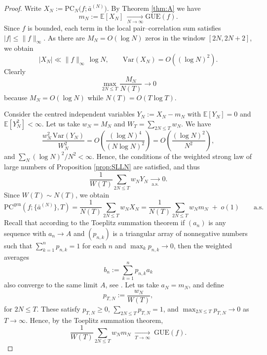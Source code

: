 \documentclass[12pt,reqno]{amsart}
\theoremstyle{plain}
\theoremstyle{definition}
\theoremstyle{remark}
\begin{document}
\begin{proof}
Write $X_N:=\mathrm{PC}_N\!\bigl(f;\bar a^{(N)}\bigr)$. 
By Theorem \ref{thm:A} we have
\begin{equation}\label{eq:mean-to-GUE}
m_N := \mathbb{E}[X_N]\ \xrightarrow[N\to\infty]{} \mathrm{GUE}(f).
\end{equation}
Since $f$ is bounded, each term in the local pair–correlation sum satisfies 
$|f|\le \|f\|_\infty$. 
As there are $M_N = O(\log N)$ zeros in the window $[2N,2N+2]$, we obtain
\begin{equation}
|X_N| \ll \|f\|_\infty\, \log N,
\qquad
\mathrm{Var}(X_N)=O\!\left((\log N)^2\right).
\end{equation}
Clearly  
\begin{equation}
\max_{2N\le T} \frac{M_N}{N(T)} \to 0
\end{equation} 
because $M_N = O(\log N)$ while $N(T)=O(T\log T)$. 

Consider the centred independent variables 
$Y_N := X_N - m_N$ with $\mathbb{E}[Y_N]=0$ and $\mathbb{E}[Y_N^2]<\infty$.
Let us take $w_N=M_N$ and $W_T=\sum_{2N\le T} w_N$. We have
\begin{equation}
\frac{w_N^2\,\mathrm{Var}(Y_N)}{W_N^2}
= O\!\left(\frac{(\log N)^4}{(N\log N)^2}\right)
= O\!\left(\frac{(\log N)^2}{N^2}\right),
\end{equation}
and $\sum_N (\log N)^2/N^2<\infty$. 
Hence, the conditions of the weighted strong law of large numbers of Proposition \ref{prop:SLLN} are satisfied, and thus 
\begin{equation}
\frac{1}{W(T)}\sum_{2N\le T} w_N Y_N
\ \xrightarrow[\text{a.s.}]{}\ 0.
\end{equation}
Since $W(T)\sim N(T)$, we obtain
\begin{equation}\label{eq:weighted-to-expectation}
\mathrm{PC}^{\mathrm{gen}}(f;\{\bar a^{(N)}\},T)
=\frac{1}{N(T)}\sum_{2N\le T} w_N X_N
=\frac{1}{N(T)}\sum_{2N\le T} w_N m_N
\;+\;o(1)
\qquad\text{a.s.}
\end{equation}
Recall that according to the Toeplitz summation theorem if $(a_n)$ is any sequence with $a_n\to A$ and $(p_{n,k})$ is a triangular array of nonnegative numbers such that  
$\sum_{k=1}^n p_{n,k}=1$ for each $n$ and $\max_k p_{n,k}\to0$,  
then the weighted averages
\begin{equation}
b_n := \sum_{k=1}^n p_{n,k} a_k
\end{equation}
also converge to the same limit $A$, see \cite{Feller1971}. Let us take $a_N=m_N$, and define
\begin{equation}
p_{T,N} := \frac{w_N}{W(T)}, 
\end{equation}
for $2N\le T$. 
These satisfy $p_{T,N}\ge0$, $\sum_{2N\le T}p_{T,N}=1$, and 
$\max_{2N\le T}p_{T,N}\to0$ as $T\to\infty$.  
Hence, by the Toeplitz summation theorem,
\begin{equation}\label{eq:toeplitz}
\frac{1}{W(T)}\sum_{2N\le T} w_N m_N 
\;\xrightarrow[T\to\infty]{}\;
\mathrm{GUE}(f).
\end{equation}


\end{proof}
\end{document}
